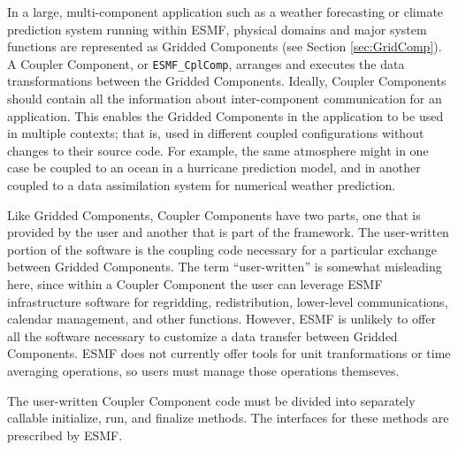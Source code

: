 %

\label{sec:CplComp}

In a large, multi-component application such as a weather 
forecasting or climate prediction system running within ESMF, 
physical domains and major system functions are represented 
as Gridded Components 
(see Section \ref{sec:GridComp}).  A Coupler Component, or 
{\tt ESMF\_CplComp}, arranges and executes the data 
transformations between the Gridded Components.  Ideally, 
Coupler Components should contain all the information 
about inter-component communication for an application.
This enables the Gridded Components in the application to be 
used in multiple contexts; that is, used in different coupled 
configurations without changes to their source code. 
For example, the same atmosphere might in one case be coupled 
to an ocean in a hurricane prediction model, and in another
coupled to a data assimilation system for numerical weather 
prediction.

Like Gridded Components, Coupler Components have two parts, one
that is provided by the user and another that is part of the 
framework.  The user-written portion of the software is the coupling
code necessary for a particular exchange between Gridded Components.  
The term ``user-written'' is somewhat misleading here, since within 
a Coupler Component the user can leverage ESMF infrastructure 
software for regridding, redistribution, lower-level communications, 
calendar management, and other functions.  However, ESMF is unlikely 
to offer all the software necessary to customize a data transfer
between Gridded Components.  ESMF does not currently offer tools 
for unit tranformations or time averaging operations, so users 
must manage those operations themseves.

The user-written Coupler Component code must be divided into 
separately callable initialize, run, and finalize methods.  The 
interfaces for these methods are prescribed by ESMF.

